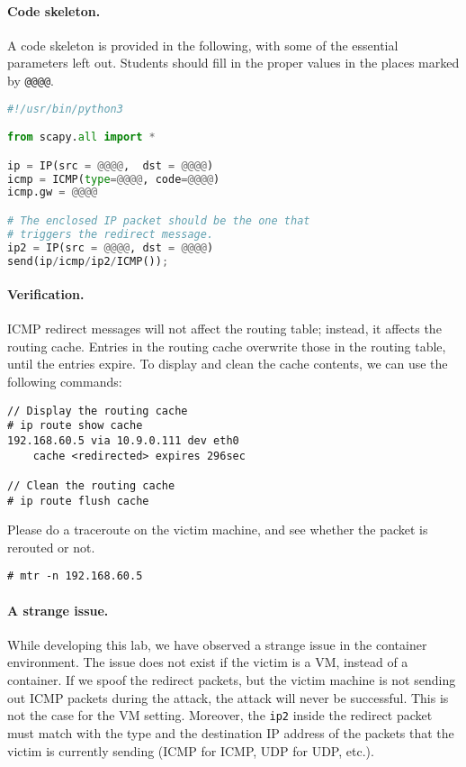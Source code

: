 \paragraph{Code skeleton.} A code skeleton is provided in the following, with
some of the essential parameters left out. Students should fill in the proper 
values in the places marked by \texttt{@@@@}.  


\begin{lstlisting}[language=python]
#!/usr/bin/python3

from scapy.all import *

ip = IP(src = @@@@,  dst = @@@@)
icmp = ICMP(type=@@@@, code=@@@@)
icmp.gw = @@@@

# The enclosed IP packet should be the one that 
# triggers the redirect message. 
ip2 = IP(src = @@@@, dst = @@@@)
send(ip/icmp/ip2/ICMP());
\end{lstlisting}
 

\paragraph{Verification.}
ICMP redirect messages will not affect the routing table; instead, it 
affects the routing cache. Entries in the routing cache overwrite 
those in the routing table, until the entries expire. To display 
and clean the cache contents, we can use the following commands: 

\begin{lstlisting}
// Display the routing cache 
# ip route show cache
192.168.60.5 via 10.9.0.111 dev eth0
    cache <redirected> expires 296sec

// Clean the routing cache
# ip route flush cache
\end{lstlisting}


Please do a traceroute on the victim machine, and see whether the packet
is rerouted or not. 

\begin{lstlisting}
# mtr -n 192.168.60.5
\end{lstlisting}
 



\paragraph{A strange issue.} While developing this lab, we have observed
a strange issue in the container environment. The issue does not exist
if the victim is a VM, instead of a container. 
If we spoof the redirect packets, but the victim machine is not 
sending out ICMP packets during the attack, the attack will never be successful. 
This is not the case for the VM setting. 
Moreover, the \texttt{ip2} inside the redirect packet must match with the
type and the destination IP address of the packets 
that the victim is currently sending (ICMP for ICMP,
UDP for UDP, etc.). 


